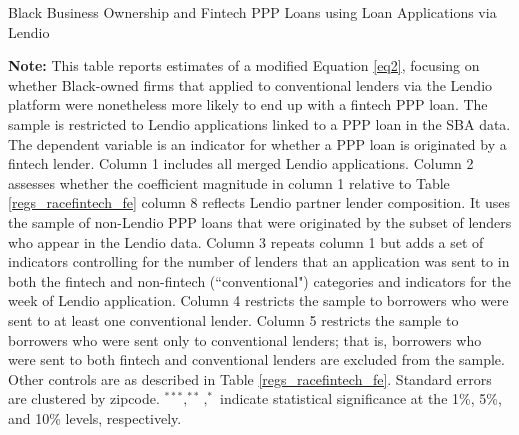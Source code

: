 \documentclass[11pt]{article}
\begin{document}
\newpage
\begin{table}[H]
	\caption{Black Business Ownership and Fintech PPP Loans using Loan Applications via Lendio} \label{lendio}
	\begin{adjustbox}{width=\linewidth, center}
		
	\end{adjustbox}

	\begin{minipage}{\textwidth} \medskip
		\footnotesize{{\bf Note: }This table reports estimates of a modified Equation \ref{eq2}, focusing on whether Black-owned firms that applied to conventional lenders via the Lendio platform were nonetheless more likely to end up with a fintech PPP loan. The sample is restricted to Lendio applications linked to a PPP loan in the SBA data. The dependent variable is an indicator for whether a PPP loan is originated by a fintech lender. Column 1 includes all merged Lendio applications. Column 2 assesses whether the coefficient magnitude in column 1 relative to Table \ref{regs_racefintech_fe} column 8 reflects Lendio partner lender composition. It uses the sample of non-Lendio PPP loans that were originated by the subset of lenders who appear in the Lendio data. Column 3 repeats column 1 but adds a set of indicators controlling for the number of lenders that an application was sent to in both the fintech and non-fintech (``conventional") categories and indicators for the week of Lendio application. Column 4 restricts the sample to borrowers who were sent to at least one conventional lender. Column 5 restricts the sample to borrowers who were sent only to conventional lenders; that is, borrowers who were sent to both fintech and conventional lenders are excluded from the sample. Other controls are as described in Table \ref{regs_racefintech_fe}. Standard errors are clustered by zipcode. $^{***}, ^{**}, ^{*}$ indicate statistical significance at the 1\%, 5\%, and 10\% levels, respectively.}%
	\end{minipage}
\end{table}
\end{document}
